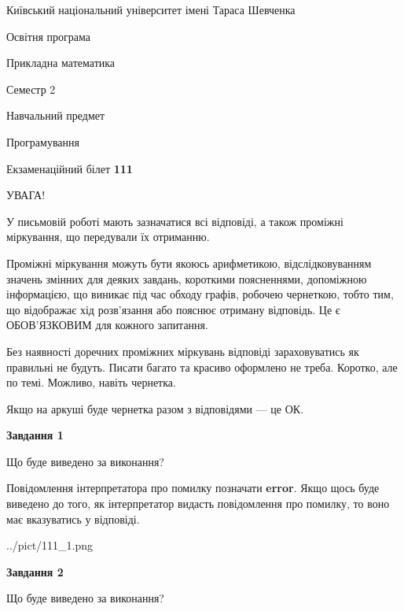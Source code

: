 \documentclass[12pt, ukrainian]{article}
\begin{document}
{{\begin {small}\par
{ \center  Київський національний університет імені Тараса Шевченка \par}
{\parbox {5 cm}{Освітня програма \hfill}{\parbox {7 cm}{Прикладна математика \hfill}}\parbox {6 cm}{\hfill Семестр 2}}\par
{\parbox {5 cm} {Навчальний предмет \hfill}\parbox {7 cm}{Програмування \hfill}\parbox {6cm}{\hfill}\par}\vspace{-7pt} \end{small}}{\center Екзаменаційний білет \No \textbf
{ 111 }\par}}
{
\begin {large}
УВАГА!

У письмовій роботі мають зазначатися всі відповіді, а також проміжні міркування, що передували їх отриманню.

Проміжні міркування можуть бути якоюсь арифметикою, відслідковуванням зна\-чень змінних для деяких завдань,
короткими поясненнями, допоміжною інформацією, що виникає під час обходу графів, робочею чернеткою,
тобто тим, що відображає хід розв’язання або пояснює отриману відповідь.
Це є ОБОВ’ЯЗКОВИМ для кожного запитання.

Без наявності доречних проміжних міркувань відповіді зараховуватись як правиль\-ні не будуть.
Писати багато та красиво оформлено не треба. Коротко, але по темі. Можли\-во, навіть чернетка.

Якщо на аркуші буде чернетка разом з відповідями --- це ОК.

\newpage

{\begin {center}\textbf{Завдання 1}\end {center}}\par
Що буде виведено за виконання?

Повідомлення інтерпретатора про помилку позначати \textbf{error}.
Якщо щось буде виведено до того, як інтерпретатор видасть повідомлення про помилку, 
то воно має вказуватись у відповіді. \par


\begin{center}
	{../pict/111_1.png}
\end{center}
\newpage

{\begin {center}\textbf{Завдання 2}\end {center}}\par
Що буде виведено за виконання?


\end{large}}
\end{document}

